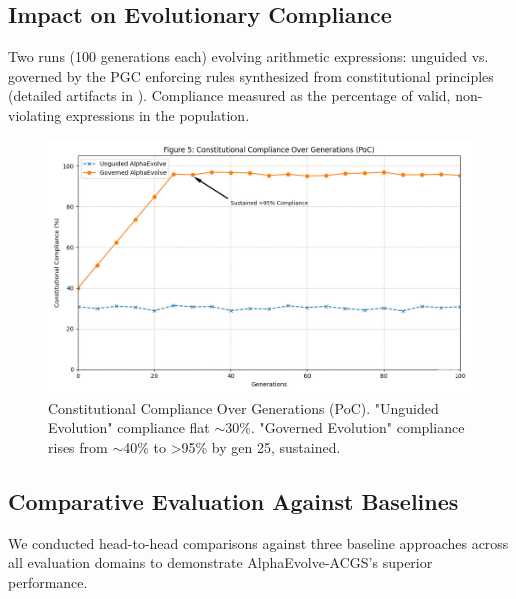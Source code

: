 \documentclass[sigconf,natbib]{acmart}
\begin{document}
\subsection{Impact on Evolutionary Compliance}
\label{subsec:impact_compliance}
Two runs (100 generations each) evolving arithmetic expressions: unguided vs. governed by the PGC enforcing rules synthesized from constitutional principles (detailed artifacts in ). Compliance measured as the percentage of valid, non-violating expressions in the population.
\begin{figure}[htbp]
  \centering
  \includegraphics[width=0.9\columnwidth,height=0.25\textheight,keepaspectratio]{fig5_compliance_generations.png}
  \caption[Constitutional compliance over generations line chart]{Constitutional Compliance Over Generations (PoC). "Unguided Evolution" compliance flat $\sim$30\%. "Governed Evolution" compliance rises from $\sim$40\% to >95\% by gen 25, sustained.}
  \label{fig:compliance_over_generations}
\end{figure}

\subsection{Comparative Evaluation Against Baselines}
\label{subsec:comparative_evaluation}

We conducted head-to-head comparisons against three baseline approaches across all evaluation domains to demonstrate AlphaEvolve-ACGS's superior performance.
\end{document}
